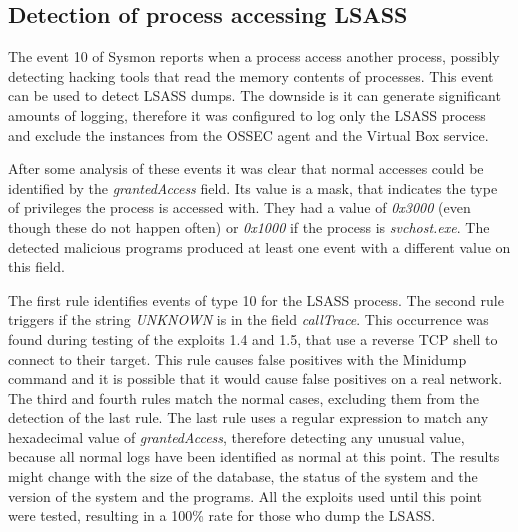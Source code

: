 \subsection{Detection of process accessing LSASS} \label{detect_lsass}
The event 10 of Sysmon reports when a process access another process, possibly detecting hacking tools that read the memory contents of processes\cite{sysmon}.
This event can be used to detect LSASS dumps\cite{sysmon_event_10_lsass}.
\linej
The downside is it can generate significant amounts of logging, therefore it was configured to log only the LSASS process and exclude the instances from the OSSEC agent and the Virtual Box service.
\linej

\linej
After some analysis of these events it was clear that normal accesses could be identified by the \textit{grantedAccess} field. Its value is a mask, that indicates the type of privileges the process is accessed with.
\linej
They had a value of \textit{0x3000} (even though these do not happen often) or \textit{0x1000} if the process is \textit{svchost.exe}. The detected malicious programs produced at least one event with a different value on this field.
\linej

\linej
The first rule identifies events of type 10 for the LSASS process.
\linej
The second rule triggers if the string \textit{UNKNOWN} is in the field \textit{callTrace}. This occurrence was found during testing of the exploits 1.4 and 1.5, that use a reverse TCP shell to connect to their target. This rule causes false positives with the Minidump command and it is possible that it would cause false positives on a real network.
\linej
The third and fourth rules match the normal cases, excluding them from the detection of the last rule.
\linej
The last rule uses a regular expression to match any hexadecimal value of \textit{grantedAccess}, therefore detecting any unusual value, because all normal logs have been identified as normal at this point.
\linej
\linej
The results might change with the size of the database, the status of the system and the version of the system and the programs.
All the exploits used until this point were tested, resulting in a 100\% rate for those who dump the LSASS.

